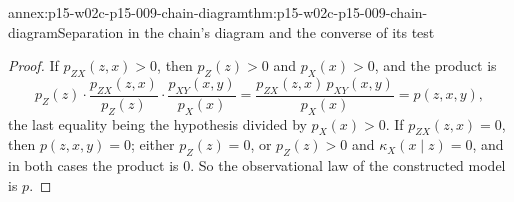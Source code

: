 \begin{annexitem}{annex:p15-w02c-p15-009-chain-diagram}{thm:p15-w02c-p15-009-chain-diagram}{Separation in the chain's diagram and the converse of its test}
\begin{proof}
If \(p_{ZX}(z,x)>0\), then \(p_Z(z)>0\) and \(p_X(x)>0\), and the product
is
\[
 p_Z(z)\cdot\frac{p_{ZX}(z,x)}{p_Z(z)}\cdot\frac{p_{XY}(x,y)}{p_X(x)}
 =\frac{p_{ZX}(z,x)\,p_{XY}(x,y)}{p_X(x)}=p(z,x,y),
\]
the last equality being the hypothesis divided by \(p_X(x)>0\). If
\(p_{ZX}(z,x)=0\), then \(p(z,x,y)=0\); either \(p_Z(z)=0\), or
\(p_Z(z)>0\) and \(\kappa_X(x\mid z)=0\), and in both cases the product
is \(0\). So the observational law of the constructed model is \(p\).
\end{proof}
\end{annexitem}
